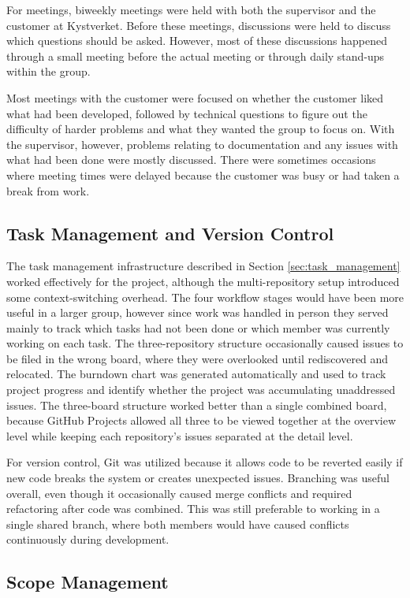 For meetings, biweekly meetings were held with both the supervisor and the customer at Kystverket. Before these meetings, discussions were held to discuss which questions should be asked. However, most of these discussions happened through a small meeting before the actual meeting or through daily stand-ups within the group.

Most meetings with the customer were focused on whether the customer liked what had been developed, followed by technical questions to figure out the difficulty of harder problems and what they wanted the group to focus on. With the supervisor, however, problems relating to documentation and any issues with what had been done were mostly discussed. There were sometimes occasions where meeting times were delayed because the customer was busy or had taken a break from work.

\subsection{Task Management and Version Control}

The task management infrastructure described in Section \ref{sec:task_management} worked effectively for the project, although the multi-repository setup introduced some context-switching overhead. The four workflow stages would have been more useful in a larger group, however since work was handled in person they served mainly to track which tasks had not been done or which member was currently working on each task. The three-repository structure occasionally caused issues to be filed in the wrong board, where they were overlooked until rediscovered and relocated. The burndown chart was generated automatically and used to track project progress and identify whether the project was accumulating unaddressed issues. The three-board structure worked better than a single combined board, because GitHub Projects allowed all three to be viewed together at the overview level while keeping each repository's issues separated at the detail level.

For version control, Git was utilized because it allows code to be reverted easily if new code breaks the system or creates unexpected issues. Branching was useful overall, even though it occasionally caused merge conflicts and required refactoring after code was combined. This was still preferable to working in a single shared branch, where both members would have caused conflicts continuously during development.

\subsection{Scope Management}

